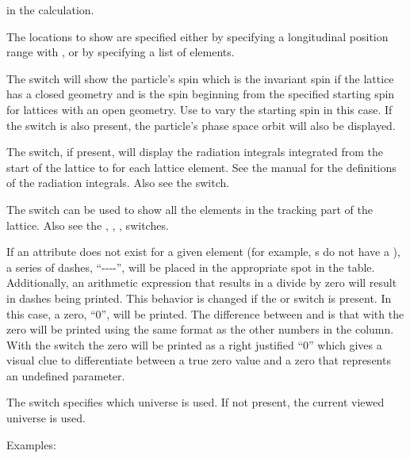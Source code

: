 {{{{{{{{\begin{description}
in the calculation.
%
\item[-s <s1>:<s2>] \Newline
The locations to show are specified either by specifying a longitudinal position range with ,
or by specifying a list  of elements. 
%
\item[-spin] \Newline
The  switch will show the particle's spin which is the invariant spin if the lattice has a
closed geometry and is the spin beginning from the specified starting spin for lattices with an open
geometry. Use  to vary the starting spin in this case. If the  switch
is also present, the particle's phase space orbit will also be displayed.
%
\item[-sum_radiation_integrals] \Newline
The  switch, if present, will display the radiation integrals
integrated from the start of the lattice to for each lattice element. See the \bmad manual for the
definitions of the radiation integrals. Also see the  switch.
%
\item[-tracking_elements] \Newline
The  switch can be used to show all the elements in the tracking part of the
lattice. Also see the , , ,  switches.
%
\item[-undef0] \Newline
If an attribute does not exist for a given element (for example, s do not have a
), a series of dashes, ``-{}-{}-{}-'', will be placed in the appropriate spot in the
table.  Additionally, an arithmetic expression that results in a divide by zero will result in
dashes being printed. This behavior is changed if the  or  switch is
present. In this case, a zero, ``0'', will be printed. The difference between  and
 is that with  the zero will be printed using the same format as the other
numbers in the column. With the  switch the zero will be printed as a right justified
``0'' which gives a visual clue to differentiate between a true zero value and a zero that
represents an undefined parameter.
%
\item[-universe <index>] \Newline
The  switch specifies which universe is used. If not present, the current viewed universe is
used.
\end{description}

Examples:

}}}}}}}}
